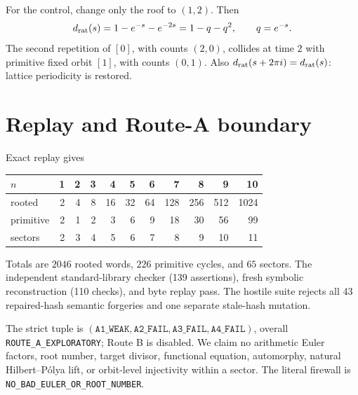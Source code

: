 \documentclass[10pt]{article}
\begin{document}
For the control, change only the roof to $(1,2)$.  Then
\[
d_{\rm rat}(s)=1-e^{-s}-e^{-2s}=1-q-q^2,\qquad q=e^{-s}.
\]
The second repetition of $[0]$, with counts $(2,0)$, collides at time $2$
with primitive fixed orbit $[1]$, with counts $(0,1)$.  Also
$d_{\rm rat}(s+2\pi i)=d_{\rm rat}(s)$: lattice periodicity is restored.

\section{Replay and Route-A boundary}
Exact replay gives
\begin{center}\small
\begin{tabular}{@{}lrrrrrrrrrr@{}}
\toprule
$n$&1&2&3&4&5&6&7&8&9&10\\\midrule
rooted&2&4&8&16&32&64&128&256&512&1024\\
primitive&2&1&2&3&6&9&18&30&56&99\\
sectors&2&3&4&5&6&7&8&9&10&11\\\bottomrule
\end{tabular}
\end{center}
Totals are $2046$ rooted words, $226$ primitive cycles, and $65$ sectors.
The independent standard-library checker (139 assertions), fresh symbolic
reconstruction (110 checks), and byte replay pass.  The hostile suite rejects
all 43 repaired-hash semantic forgeries and one separate stale-hash mutation.

The strict tuple is
$(\texttt{A1\_WEAK},\texttt{A2\_FAIL},\texttt{A3\_FAIL},
\texttt{A4\_FAIL})$, overall \texttt{ROUTE\_A\_EXPLORATORY}; Route B is
disabled.  We claim no arithmetic Euler factors, root number, target divisor,
functional equation, automorphy, natural Hilbert--P\'olya lift, or
orbit-level injectivity within a sector.  The literal firewall is
\texttt{NO\_BAD\_EULER\_OR\_ROOT\_NUMBER}.
\end{document}
